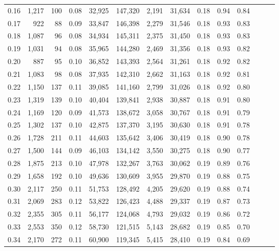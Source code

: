 \begin{tabular}{rrrrrrrrrrrrrr}
0.16 &  1,217 &  100 &  0.08 &   32,925 &  147,320 &   2,191 &  31,634 &  0.18 &  0.94 &      0.84 \\
0.17 &    922 &   88 &  0.09 &   33,847 &  146,398 &   2,279 &  31,546 &  0.18 &  0.93 &      0.83 \\
0.18 &  1,087 &   96 &  0.08 &   34,934 &  145,311 &   2,375 &  31,450 &  0.18 &  0.93 &      0.83 \\
0.19 &  1,031 &   94 &  0.08 &   35,965 &  144,280 &   2,469 &  31,356 &  0.18 &  0.93 &      0.82 \\
0.20 &    887 &   95 &  0.10 &   36,852 &  143,393 &   2,564 &  31,261 &  0.18 &  0.92 &      0.82 \\
0.21 &  1,083 &   98 &  0.08 &   37,935 &  142,310 &   2,662 &  31,163 &  0.18 &  0.92 &      0.81 \\
0.22 &  1,150 &  137 &  0.11 &   39,085 &  141,160 &   2,799 &  31,026 &  0.18 &  0.92 &      0.80 \\
0.23 &  1,319 &  139 &  0.10 &   40,404 &  139,841 &   2,938 &  30,887 &  0.18 &  0.91 &      0.80 \\
0.24 &  1,169 &  120 &  0.09 &   41,573 &  138,672 &   3,058 &  30,767 &  0.18 &  0.91 &      0.79 \\
0.25 &  1,302 &  137 &  0.10 &   42,875 &  137,370 &   3,195 &  30,630 &  0.18 &  0.91 &      0.78 \\
0.26 &  1,728 &  211 &  0.11 &   44,603 &  135,642 &   3,406 &  30,419 &  0.18 &  0.90 &      0.78 \\
0.27 &  1,500 &  144 &  0.09 &   46,103 &  134,142 &   3,550 &  30,275 &  0.18 &  0.90 &      0.77 \\
0.28 &  1,875 &  213 &  0.10 &   47,978 &  132,267 &   3,763 &  30,062 &  0.19 &  0.89 &      0.76 \\
0.29 &  1,658 &  192 &  0.10 &   49,636 &  130,609 &   3,955 &  29,870 &  0.19 &  0.88 &      0.75 \\
0.30 &  2,117 &  250 &  0.11 &   51,753 &  128,492 &   4,205 &  29,620 &  0.19 &  0.88 &      0.74 \\
0.31 &  2,069 &  283 &  0.12 &   53,822 &  126,423 &   4,488 &  29,337 &  0.19 &  0.87 &      0.73 \\
0.32 &  2,355 &  305 &  0.11 &   56,177 &  124,068 &   4,793 &  29,032 &  0.19 &  0.86 &      0.72 \\
0.33 &  2,553 &  350 &  0.12 &   58,730 &  121,515 &   5,143 &  28,682 &  0.19 &  0.85 &      0.70 \\
0.34 &  2,170 &  272 &  0.11 &   60,900 &  119,345 &   5,415 &  28,410 &  0.19 &  0.84 &      0.69 \\

\end{tabular}
